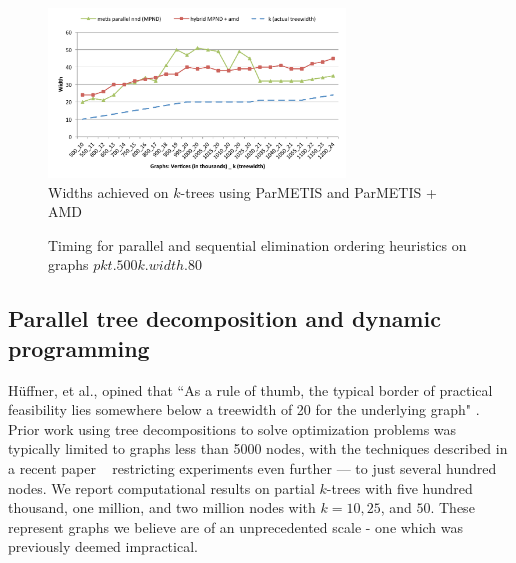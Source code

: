 \documentclass[conference]{IEEEtran}
\begin{document}
\begin{figure}[!ht]
\includegraphics[angle=0,width=3.1in]{figures/newfig6_col.pdf}
\caption{Widths achieved on $k$-trees using ParMETIS and ParMETIS + AMD}
\label{fig:eo_width}
\end{figure}

\begin{figure}[!ht]
\caption{Timing for parallel and sequential elimination ordering heuristics on graphs $pkt.500k.width.80$}
\label{fig:test_eo_width}
\end{figure}


\subsection{Parallel tree decomposition and dynamic programming}\label{sec:exp_td_dp}

H\"uffner, et al., opined that
``As a rule of thumb, the typical border
of practical feasibility lies somewhere below a treewidth of 20 for the underlying
graph" \cite{huffner}. Prior work using tree
decompositions to solve optimization problems was typically limited to graphs less than 5000 nodes,
with the techniques described in a recent paper ~\cite{cliquecover} restricting experiments even further --- to just several hundred nodes. We report computational results on partial $k$-trees with five hundred thousand, one
million, and two million nodes with $k = 10,25$, and $50$. These represent graphs we believe are of an unprecedented scale - one which was previously deemed impractical.
\end{document}
